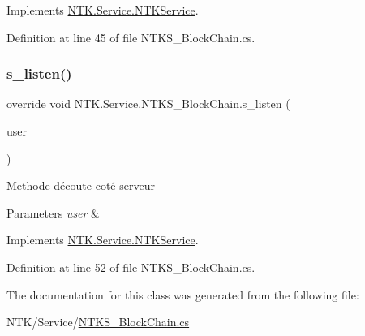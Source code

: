 Implements \mbox{\hyperlink{class_n_t_k_1_1_service_1_1_n_t_k_service_abab6261724876aea1ba1590720c2b994}{N\+T\+K.\+Service.\+N\+T\+K\+Service}}.



Definition at line 45 of file N\+T\+K\+S\+\_\+\+Block\+Chain.\+cs.

\mbox{\label{class_n_t_k_1_1_service_1_1_n_t_k_s___block_chain_a5904f46c7cd3d4bd0b229c5cf9b4811d}} 
\subsubsection{\texorpdfstring{s\_listen()}{s\_listen()}}
{\footnotesize\ttfamily override void N\+T\+K.\+Service.\+N\+T\+K\+S\+\_\+\+Block\+Chain.\+s\+\_\+listen (\begin{DoxyParamCaption}\item[{\mbox{\hyperlink{class_n_t_k_1_1_n_t_k_user}{N\+T\+K\+User}}}]{user }\end{DoxyParamCaption})\hspace{0.3cm}{\ttfamily [virtual]}}



Methode d\textquotesingle{}écoute coté serveur 


\begin{DoxyParams}{Parameters}
{\em user} & \\
\hline
\end{DoxyParams}


Implements \mbox{\hyperlink{class_n_t_k_1_1_service_1_1_n_t_k_service_a7c7cb8c5ddc57bebe6d9784744c976d7}{N\+T\+K.\+Service.\+N\+T\+K\+Service}}.



Definition at line 52 of file N\+T\+K\+S\+\_\+\+Block\+Chain.\+cs.



The documentation for this class was generated from the following file\+:\begin{DoxyCompactItemize}
\item 
N\+T\+K/\+Service/\mbox{\hyperlink{_n_t_k_s___block_chain_8cs}{N\+T\+K\+S\+\_\+\+Block\+Chain.\+cs}}\end{DoxyCompactItemize}
